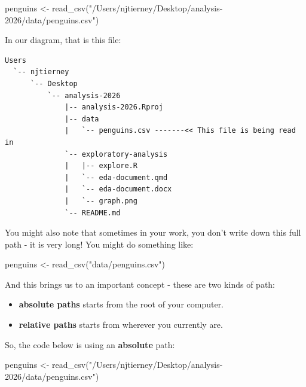 \documentclass[
  letterpaper,
  justified,
  a4paper]{tufte-book}
\makeatletter
\newenvironment{Shaded}{\begin{snugshade}}{\end{snugshade}}
\newcommand{\FunctionTok}[1]{\textcolor[rgb]{0.28,0.35,0.67}{#1}}
\newcommand{\NormalTok}[1]{\textcolor[rgb]{0.00,0.23,0.31}{#1}}
\newcommand{\OtherTok}[1]{\textcolor[rgb]{0.00,0.23,0.31}{#1}}
\newcommand{\StringTok}[1]{\textcolor[rgb]{0.13,0.47,0.30}{#1}}
\providecommand{\tightlist}{%
  \setlength{\itemsep}{0pt}\setlength{\parskip}{0pt}}
\providecommand{\tightlist}{%
  \setlength{\itemsep}{0pt}\setlength{\parskip}{0pt}}
\let\rbporigShaded\Shaded
\let\rbporigendShaded\endShaded
\renewenvironment{Shaded}{%
  \begingroup
  \ifdim\linewidth=\rbpbodywidth
    \advance\linewidth by \@tufte@overhang
    \advance\hsize by \@tufte@overhang
    \advance\columnwidth by \@tufte@overhang
  \fi
  \rbporigShaded
}{%
  \rbporigendShaded
  \endgroup
}
\makeatother
\begin{document}
\begin{Shaded}
\begin{Highlighting}[]
\NormalTok{penguins }\OtherTok{\textless{}{-}} \FunctionTok{read\_csv}\NormalTok{(}\StringTok{"/Users/njtierney/Desktop/analysis{-}2026/data/penguins.csv"}\NormalTok{)}
\end{Highlighting}
\end{Shaded}

In our diagram, that is this file:

\begin{verbatim}
Users
  `-- njtierney 
      `-- Desktop 
          `-- analysis-2026 
              |-- analysis-2026.Rproj 
              |-- data 
              |   `-- penguins.csv -------<< This file is being read in
              `-- exploratory-analysis
              |   |-- explore.R 
              |   `-- eda-document.qmd 
              |   `-- eda-document.docx 
              |   `-- graph.png 
              `-- README.md 
\end{verbatim}

You might also note that sometimes in your work, you don't write down
this full path - it is very long! You might do something like:

\begin{Shaded}
\begin{Highlighting}[]
\NormalTok{penguins }\OtherTok{\textless{}{-}} \FunctionTok{read\_csv}\NormalTok{(}\StringTok{"data/penguins.csv"}\NormalTok{)}
\end{Highlighting}
\end{Shaded}

And this brings us to an important concept - these are two kinds of
path:

\begin{itemize}
\tightlist
\item
  \textbf{absolute paths} starts from the root of your computer.
\item
  \textbf{relative paths} starts from wherever you currently are.
\end{itemize}

So, the code below is using an \textbf{absolute} path:

\begin{Shaded}
\begin{Highlighting}[]
\NormalTok{penguins }\OtherTok{\textless{}{-}} \FunctionTok{read\_csv}\NormalTok{(}\StringTok{"/Users/njtierney/Desktop/analysis{-}2026/data/penguins.csv"}\NormalTok{)}
\end{Highlighting}
\end{Shaded}
\end{document}
